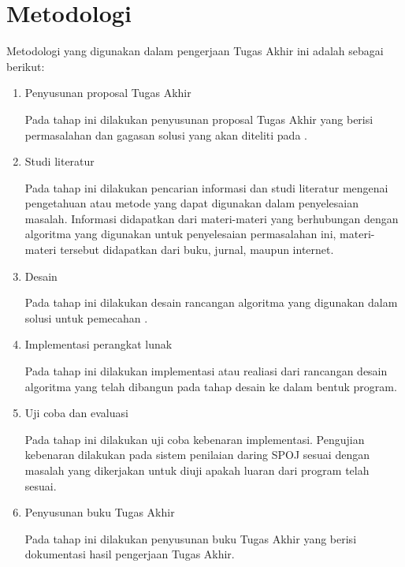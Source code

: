 \section{Metodologi}
Metodologi yang digunakan dalam pengerjaan Tugas Akhir ini adalah sebagai berikut:
\begin{enumerate}
	
	\item Penyusunan proposal Tugas Akhir

	Pada tahap ini dilakukan penyusunan proposal Tugas Akhir yang berisi permasalahan dan gagasan solusi yang akan diteliti pada \problem.
	
	\item Studi literatur
	
	Pada tahap ini dilakukan pencarian informasi dan studi literatur mengenai pengetahuan atau metode yang dapat digunakan dalam penyelesaian masalah. Informasi didapatkan dari materi-materi yang berhubungan dengan algoritma yang digunakan untuk penyelesaian permasalahan ini, materi-materi tersebut didapatkan dari buku, jurnal, maupun internet.
	
	\item Desain
	
	Pada tahap ini dilakukan desain rancangan algoritma yang digunakan dalam solusi untuk pemecahan \problem.
	
	\item Implementasi perangkat lunak
	
	Pada tahap ini dilakukan implementasi atau realiasi dari rancangan desain algoritma yang telah dibangun pada tahap desain ke dalam bentuk program.
	
	\item Uji coba dan evaluasi
	
	Pada tahap ini dilakukan uji coba kebenaran implementasi. Pengujian kebenaran dilakukan pada sistem penilaian daring SPOJ sesuai dengan masalah yang dikerjakan untuk diuji apakah luaran dari program telah sesuai.
	
	\item Penyusunan buku Tugas Akhir
	
	Pada tahap ini dilakukan penyusunan buku Tugas Akhir yang berisi dokumentasi hasil pengerjaan Tugas Akhir.
\end{enumerate}


